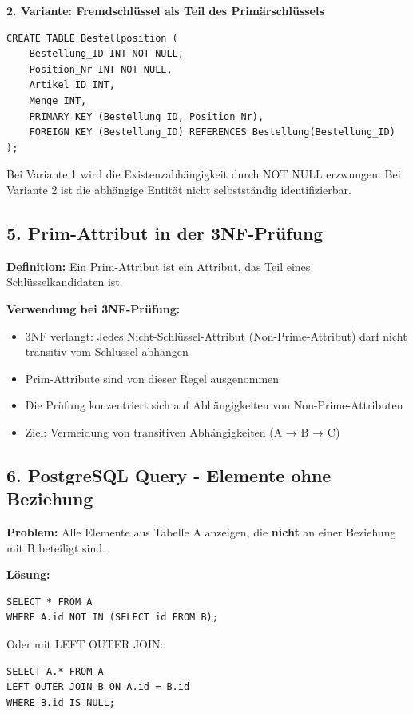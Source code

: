 \documentclass[12pt,a4paper]{article}
\begin{document}
\textbf{2. Variante: Fremdschlüssel als Teil des Primärschlüssels}
\begin{verbatim}
CREATE TABLE Bestellposition (
    Bestellung_ID INT NOT NULL,
    Position_Nr INT NOT NULL,
    Artikel_ID INT,
    Menge INT,
    PRIMARY KEY (Bestellung_ID, Position_Nr),
    FOREIGN KEY (Bestellung_ID) REFERENCES Bestellung(Bestellung_ID)
);
\end{verbatim}

Bei Variante 1 wird die Existenzabhängigkeit durch NOT NULL erzwungen. Bei Variante 2 ist die abhängige Entität nicht selbstständig identifizierbar.

\subsection*{5. Prim-Attribut in der 3NF-Prüfung}

\textbf{Definition:}
Ein Prim-Attribut ist ein Attribut, das Teil eines Schlüsselkandidaten ist.

\textbf{Verwendung bei 3NF-Prüfung:}
\begin{itemize}
    \item 3NF verlangt: Jedes Nicht-Schlüssel-Attribut (Non-Prime-Attribut) darf nicht transitiv vom Schlüssel abhängen
    \item Prim-Attribute sind von dieser Regel ausgenommen
    \item Die Prüfung konzentriert sich auf Abhängigkeiten von Non-Prime-Attributen
    \item Ziel: Vermeidung von transitiven Abhängigkeiten (A → B → C)
\end{itemize}

\subsection*{6. PostgreSQL Query - Elemente ohne Beziehung}

\textbf{Problem:} Alle Elemente aus Tabelle A anzeigen, die \textbf{nicht} an einer Beziehung mit B beteiligt sind.

\textbf{Lösung:}
\begin{verbatim}
SELECT * FROM A
WHERE A.id NOT IN (SELECT id FROM B);
\end{verbatim}

Oder mit LEFT OUTER JOIN:
\begin{verbatim}
SELECT A.* FROM A
LEFT OUTER JOIN B ON A.id = B.id
WHERE B.id IS NULL;
\end{verbatim}
\end{document}
